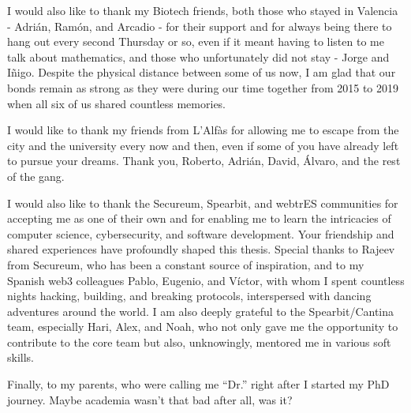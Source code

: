 I would also like to thank my Biotech friends, both those who stayed in Valencia - Adrián, Ramón, and Arcadio - for their support and for always being there to hang out every second Thursday or so, even if it meant having to listen to me talk about mathematics, and those who unfortunately did not stay - Jorge and Iñigo. Despite the physical distance between some of us now, I am glad that our bonds remain as strong as they were during our time together from 2015 to 2019 when all six of us shared countless memories.

I would like to thank my friends from L'Alfàs for allowing me to escape from the city and the university every now and then, even if some of you have already left to pursue your dreams. Thank you, Roberto, Adrián, David, Álvaro, and the rest of the gang.

I would also like to thank the Secureum, Spearbit, and webtrES communities for accepting me as one of their own and for enabling me to learn the intricacies of computer science, cybersecurity, and software development. Your friendship and shared experiences have profoundly shaped this thesis. Special thanks to Rajeev from Secureum, who has been a constant source of inspiration, and to my Spanish web3 colleagues Pablo, Eugenio, and Víctor, with whom I spent countless nights hacking, building, and breaking protocols, interspersed with dancing adventures around the world. I am also deeply grateful to the Spearbit/Cantina team, especially Hari, Alex, and Noah, who not only gave me the opportunity to contribute to the core team but also, unknowingly, mentored me in various soft skills.

Finally, to my parents, who were calling me ``Dr.'' right after I started my PhD journey. Maybe academia wasn't that bad after all, was it?